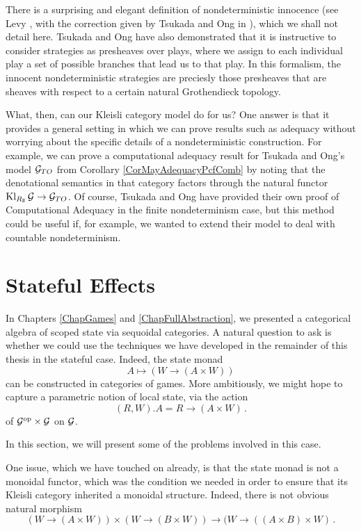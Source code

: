 \documentclass[11pt]{report}
\begin{document}
There is a surprising and elegant definition of nondeterministic innocence (see Levy \cite{levy2014morphisms}, with the correction given by Tsukada and Ong in \cite[Proposition 46]{TsukadaSheaves}), which we shall not detail here.
Tsukada and Ong have also demonstrated that it is instructive to consider strategies as presheaves over plays, where we assign to each individual play a set of possible branches that lead us to that play.  
In this formalism, the innocent nondeterministic strategies are preciesly those presheaves that are sheaves with respect to a certain natural Grothendieck topology.

What, then, can our Kleisli category model do for us?
One answer is that it provides a general setting in which we can prove results such as adequacy without worrying about the specific details of a nondeterministic construction.  
For example, we can prove a computational adequacy result for Tsukada and Ong's model $\mathcal G_{TO}$ from Corollary \ref{CorMayAdequacyPcfComb} by noting that the denotational semantics in that category factors through the natural functor $\operatorname{Kl}_{R_{\mathbb{B}}}\mathcal G \to \mathcal G_{TO}$.  
Of course, Tsukada and Ong have provided their own proof of Computational Adequacy in the finite nondeterminism case, but this method could be useful if, for example, we wanted to extend their model to deal with countable nondeterminism.

\section{Stateful Effects}

In Chapters \ref{ChapGames} and \ref{ChapFullAbstraction}, we presented a categorical algebra of scoped state via sequoidal categories.  
A natural question to ask is whether we could use the techniques we have developed in the remainder of this thesis in the stateful case.  
Indeed, the state monad
\[
  A \mapsto (W \to (A \times W))
  \]
can be constructed in categories of games.  
More ambitiously, we might hope to capture a parametric notion of local state, via the action
\[
  (R,W).A = R \to (A \times W)\,.
  \]
of $\mathcal G^{\mathrm{op}} \times \mathcal G$ on $\mathcal G$.

In this section, we will present some of the problems involved in this case.  

One issue, which we have touched on already, is that the state monad is not a monoidal functor, which was the condition we needed in order to ensure that its Kleisli category inherited a monoidal structure.  
Indeed, there is not obvious natural morphism
\[
  (W \to (A \times W)) \times (W \to (B \times W)) \to (W \to ((A \times B) \times W)\,.
  \]
\end{document}
